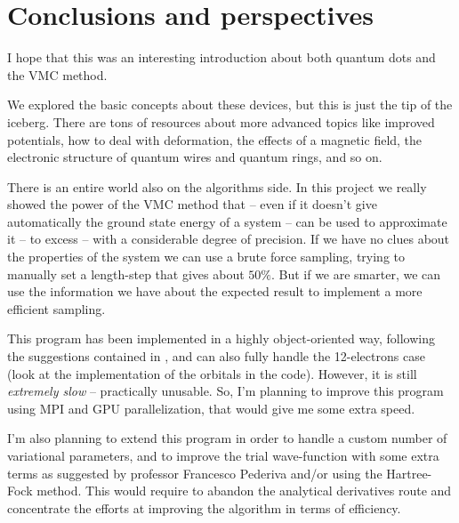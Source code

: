 
\chapter{Conclusions and perspectives}
I hope that this was an interesting introduction about both quantum dots and the VMC method.

We explored the basic concepts about these devices, but this is just the tip of the iceberg. There are tons of resources about more advanced topics like improved potentials, how to deal with deformation, the effects of a magnetic field, the electronic structure of quantum wires and quantum rings, and so on.

There is an entire world also on the algorithms side. In this project we really showed the power of the VMC method that -- even if it doesn't give automatically the ground state energy of a system -- can be used to approximate it -- to excess -- with a considerable degree of precision. If we have no clues about the properties of the system we can use a brute force sampling, trying to manually set a length-step that gives about $50\%$. But if we are smarter, we can use the information we have about the expected result to implement a more efficient sampling.

This program has been implemented in a highly object-oriented way, following the suggestions contained in \cite{Hoegberget2013}, and can also fully handle the 12-electrons case (look at the implementation of the orbitals in the code). However, it is still \emph{extremely slow} -- practically unusable. So, I'm planning to improve this program using MPI and GPU parallelization, that would give me some extra speed.

I'm also planning to extend this program in order to handle a custom number of variational parameters, and to improve the trial wave-function with some extra terms as suggested by professor Francesco Pederiva and/or using the Hartree-Fock method. This would require to abandon the analytical derivatives route and concentrate the efforts at improving the algorithm in terms of efficiency.

